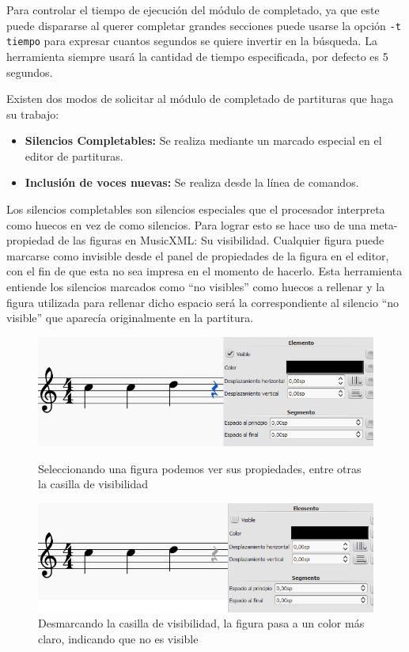 Para controlar el tiempo de ejecución del módulo de completado, ya que este puede dispararse al querer completar grandes secciones puede usarse la opción \texttt{-t tiempo} para expresar cuantos segundos se quiere invertir en la búsqueda. La herramienta siempre usará la cantidad de tiempo especificada, por defecto es 5 segundos.

Existen dos modos de solicitar al módulo de completado de partituras que haga su trabajo:
\begin{itemize}
	\item \textbf{Silencios Completables:} Se realiza mediante un marcado especial en el editor de partituras.
	\item \textbf{Inclusión de voces nuevas:} Se realiza desde la línea de comandos.
\end{itemize}

Los silencios completables son silencios especiales que el procesador interpreta como huecos en vez de como silencios. Para lograr esto se hace uso de una meta-propiedad de las figuras en MusicXML: Su visibilidad. Cualquier figura puede marcarse como invisible desde el panel de propiedades de la figura en el editor, con el fin de que esta no sea impresa en el momento de hacerlo. Esta herramienta entiende los silencios marcados como ``no visibles'' como huecos a rellenar y la figura utilizada para rellenar dicho espacio será la correspondiente al silencio ``no visible'' que aparecía originalmente en la partitura.

\begin{figure}[h]
	\centering
	\includegraphics[width=0.8\linewidth]{imagenes/usage/select_silence.jpg}
	\caption{Seleccionando una figura podemos ver sus propiedades, entre otras la casilla de visibilidad}
	\includegraphics[width=0.8\linewidth]{imagenes/usage/invisible_silence.jpg}
	\caption{Desmarcando la casilla de visibilidad, la figura pasa a un color más claro, indicando que no es visible}
	\label{fig:invisible_silence}
\end{figure}

